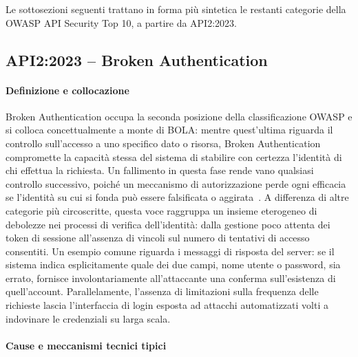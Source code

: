 Le sottosezioni seguenti trattano in forma più sintetica le restanti categorie della OWASP API
Security Top 10, a partire da API2:2023.

\newpage
\subsection{API2:2023 -- Broken Authentication}

\paragraph{Definizione e collocazione}
Broken Authentication occupa la seconda posizione della classificazione OWASP e si colloca concettualmente a monte di BOLA: mentre quest'ultima riguarda il controllo sull'accesso a uno specifico dato o risorsa, Broken Authentication compromette la capacità stessa del sistema di stabilire con certezza l'identità di chi effettua la richiesta. Un fallimento in questa fase rende vano qualsiasi controllo successivo, poiché un meccanismo di autorizzazione perde ogni efficacia se l'identità su cui si fonda può essere falsificata o aggirata~\cite{owasp2023api2}.
A differenza di altre categorie più circoscritte, questa voce raggruppa un insieme eterogeneo di debolezze nei processi di verifica dell'identità: dalla gestione poco attenta dei token di sessione all'assenza di vincoli sul numero di tentativi di accesso consentiti. Un esempio comune riguarda i messaggi di risposta del server: se il sistema indica esplicitamente quale dei due campi, nome utente o password, sia errato, fornisce involontariamente all'attaccante una conferma sull'esistenza di quell'account. Parallelamente, l'assenza di limitazioni sulla frequenza delle richieste lascia l'interfaccia di login esposta ad attacchi automatizzati volti a indovinare le credenziali su larga scala.

\paragraph{Cause e meccanismi tecnici tipici}

